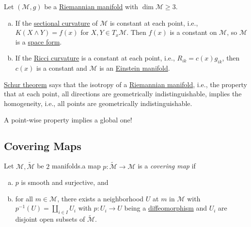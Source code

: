 \begin{theorem}\label{thm:Schur}
	Let \((\mathcal{M} , g)\) be a \hyperref[def:Riemannian-manifold]{Riemannian manifold} with \(\dim \mathcal{M} \geq 3\).
	\begin{enumerate}[(a)]
		\item If the \hyperref[def:sectional-curvature]{sectional curvature} of \(\mathcal{M} \) is constant at each point, i.e., \(K(X\wedge Y) = f(x)\) for \(X, Y\in T_x \mathcal{M} \). Then \(f(x)\) is a constant on \(\mathcal{M} \), so \(\mathcal{M} \) is a \hyperref[def:space-form]{space form}.
		\item If the \hyperref[def:Ricci-curvature-tensor]{Ricci curvature} is a constant at each point, i.e., \(R_{ik} = c(x) g_{ik}\), then \(c(x)\) is a constant and \(\mathcal{M} \) is an \hyperref[def:Einstein-manifold]{Einstein manifold}.
	\end{enumerate}
\end{theorem}

\begin{remark}
	\hyperref[thm:Schur]{Schur theorem} says that the isotropy of a \hyperref[def:Riemannian-manifold]{Riemannian manifold}, i.e., the property that at each point, all directions are geometrically indistinguishable, implies the homogeneity, i.e., all points are geometrically indistinguishable.
\end{remark}

\begin{note}
	A point-wise property implies a global one!
\end{note}

\subsection{Covering Maps}
\begin{definition}\label{def:covering-map}
	Let \(\mathcal{M} , \widetilde{\mathcal{M}} \) be \(2\) manifolds.a map \(p\colon \widetilde{\mathcal{M}} \to \mathcal{M} \) is a \emph{covering map} if
	\begin{enumerate}[(a)]
		\item \(p\) is smooth and surjective, and
		\item for all \(m\in \mathcal{M} \), there exists a neighborhood \(U\) at \(m\) in \(\mathcal{M} \) with \(p ^{-1} (U) = \coprod_{i\in I} U_i\) with \(p\colon U_i \to U\) being a \hyperref[def:diffeomorphism]{diffeomorphism} and \(U_i\) are disjoint open subsets of \(\widetilde{\mathcal{M}} \).
	\end{enumerate}
\end{definition}


